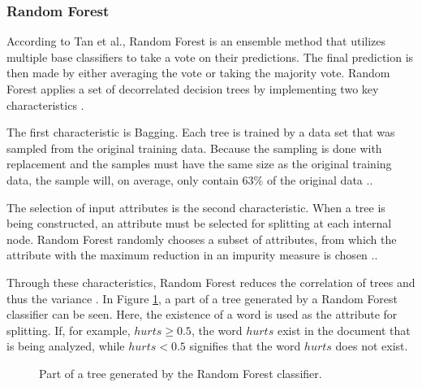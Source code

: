 \subsubsection{Random Forest}
        According to Tan et al., Random Forest is an ensemble method that utilizes multiple base classifiers to take a vote on their predictions. The final prediction is then made by either averaging the vote or taking the majority vote. Random Forest applies a set of decorrelated decision trees by implementing two key characteristics \cite{DBLP:books/aw/TanSKK2019}.
        
        The first characteristic is Bagging. Each tree is trained by a data set that was sampled from the original training data. Because the sampling is done with replacement and the samples must have the same size as the original training data, the sample will, on average, only contain 63\% of the original data \cite{DBLP:books/aw/TanSKK2019}..
        
        The selection of input attributes is the second characteristic. When a tree is being constructed, an attribute must be selected for splitting at each internal node. Random Forest randomly chooses a subset of attributes, from which the attribute with the maximum reduction in an impurity measure is chosen \cite{DBLP:books/aw/TanSKK2019}..
        
        Through these characteristics, Random Forest reduces the correlation of trees and thus the variance \cite{DBLP:books/aw/TanSKK2019}. In Figure \ref{fig:tree}, a part of a tree generated by a Random Forest classifier can be seen. Here, the existence of a word is used as the attribute for splitting. If, for example, $hurts \geq 0.5$, the word $hurts$ exist in the document that is being analyzed, while $hurts < 0.5$ signifies that the word $hurts$ does not exist.
        
        \begin{figure}[h!]
        \centering
    \caption{Part of a tree generated by the Random Forest classifier.}
      \label{fig:tree}
\end{figure}
